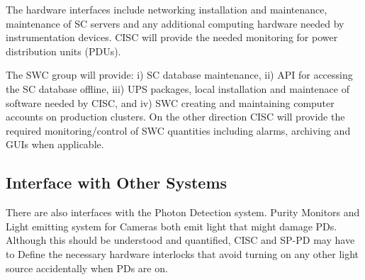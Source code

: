  The hardware interfaces include networking installation and maintenance, maintenance of SC servers and any additional computing hardware needed by instrumentation devices.
 CISC will provide the needed monitoring for power distribution units (PDUs). 

 The SWC group will provide: i) SC database maintenance, ii) API for accessing the SC database offline,
 iii) UPS packages, local installation and maintenace of software needed by CISC, and iv) SWC creating and maintaining computer accounts on production clusters. 
 On the other direction CISC will provide the required monitoring/control of SWC quantities including alarms, archiving and GUIs when applicable. 



\subsection{Interface with Other Systems}
\label{sec:fdsp-slow-cryo-slow-other}


There are also interfaces with the Photon Detection system.
Purity Monitors and Light emitting system for Cameras both emit light that might damage PDs.
Although this should be understood and quantified, CISC and SP-PD may have to Define the necessary hardware interlocks
that avoid turning on any other light source accidentally when PDs are on.

